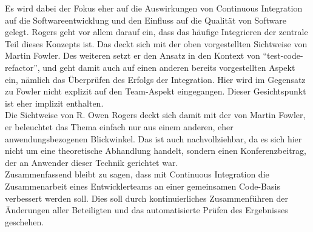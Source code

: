 Es wird dabei der Fokus eher auf die Auswirkungen von Continuous Integration auf die Softwareentwicklung und den Einfluss auf die Qualität von Software gelegt. Rogers geht vor allem darauf ein, dass das häufige Integrieren der zentrale Teil dieses Konzepts ist. Das deckt sich mit der oben vorgestellten Sichtweise von Martin Fowler. Des weiteren setzt er den Ansatz in den Kontext von "`test-code-refactor"', und geht damit auch auf einen anderen bereits vorgestellten Aspekt ein, nämlich das Überprüfen des Erfolgs der Integration. 
Hier wird im Gegensatz zu Fowler nicht explizit auf den Team-Aspekt eingegangen. Dieser Gesichtspunkt ist eher implizit enthalten.\\
Die Sichtweise von R. Owen Rogers deckt sich damit mit der von Martin Fowler, er beleuchtet das Thema einfach nur aus einem anderen, eher anwendungsbezogenen Blickwinkel. Das ist auch nachvollziehbar, da es sich hier nicht um eine theoretische Abhandlung handelt, sondern einen Konferenzbeitrag, der an Anwender dieser Technik gerichtet war.\\

Zusammenfassend bleibt zu sagen, dass mit Continuous Integration die Zusammenarbeit eines Entwicklerteams an einer gemeinsamen Code-Basis verbessert werden soll. Dies soll durch kontinuierliches Zusammenführen der Änderungen aller Beteiligten und das automatisierte Prüfen des Ergebnisses geschehen.
